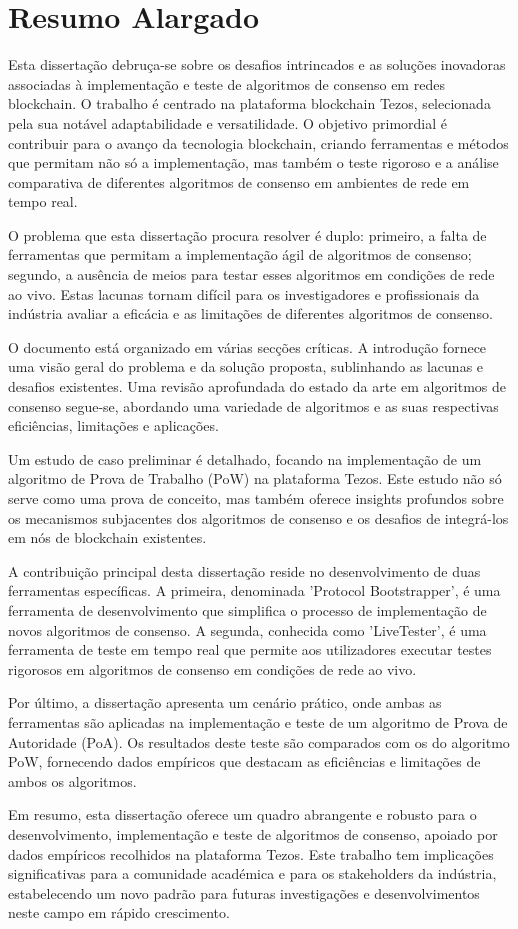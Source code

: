 \chapter*{Resumo Alargado}
Esta dissertação debruça-se sobre os desafios intrincados e as soluções inovadoras associadas à implementação e teste de algoritmos de consenso em redes blockchain. O trabalho é centrado na plataforma blockchain Tezos, selecionada pela sua notável adaptabilidade e versatilidade. O objetivo primordial é contribuir para o avanço da tecnologia blockchain, criando ferramentas e métodos que permitam não só a implementação, mas também o teste rigoroso e a análise comparativa de diferentes algoritmos de consenso em ambientes de rede em tempo real.

O problema que esta dissertação procura resolver é duplo: primeiro, a falta de ferramentas que permitam a implementação ágil de algoritmos de consenso; segundo, a ausência de meios para testar esses algoritmos em condições de rede ao vivo. Estas lacunas tornam difícil para os investigadores e profissionais da indústria avaliar a eficácia e as limitações de diferentes algoritmos de consenso.

O documento está organizado em várias secções críticas. A introdução fornece uma visão geral do problema e da solução proposta, sublinhando as lacunas e desafios existentes. Uma revisão aprofundada do estado da arte em algoritmos de consenso segue-se, abordando uma variedade de algoritmos e as suas respectivas eficiências, limitações e aplicações.

Um estudo de caso preliminar é detalhado, focando na implementação de um algoritmo de Prova de Trabalho (PoW) na plataforma Tezos. Este estudo não só serve como uma prova de conceito, mas também oferece insights profundos sobre os mecanismos subjacentes dos algoritmos de consenso e os desafios de integrá-los em nós de blockchain existentes.

A contribuição principal desta dissertação reside no desenvolvimento de duas ferramentas específicas. A primeira, denominada 'Protocol Bootstrapper', é uma ferramenta de desenvolvimento que simplifica o processo de implementação de novos algoritmos de consenso. A segunda, conhecida como 'LiveTester', é uma ferramenta de teste em tempo real que permite aos utilizadores executar testes rigorosos em algoritmos de consenso em condições de rede ao vivo.

Por último, a dissertação apresenta um cenário prático, onde ambas as ferramentas são aplicadas na implementação e teste de um algoritmo de Prova de Autoridade (PoA). Os resultados deste teste são comparados com os do algoritmo PoW, fornecendo dados empíricos que destacam as eficiências e limitações de ambos os algoritmos.

Em resumo, esta dissertação oferece um quadro abrangente e robusto para o desenvolvimento, implementação e teste de algoritmos de consenso, apoiado por dados empíricos recolhidos na plataforma Tezos. Este trabalho tem implicações significativas para a comunidade académica e para os stakeholders da indústria, estabelecendo um novo padrão para futuras investigações e desenvolvimentos neste campo em rápido crescimento.
